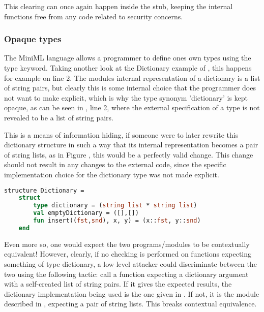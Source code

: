 This clearing can once again happen inside the stub, keeping the internal functions free from any code related to security concerns.

\subsubsection{Opaque types}

The \mbox{MiniML} language allows a programmer to define ones own types using the type keyword. Taking another look at the Dictionary example of , this happens for example on line 2. The modules internal representation of a dictionary is a list of string pairs, but clearly this is some internal choice that the programmer does not want to make explicit, which is why the type synonym 'dictionary' is kept opaque, as can be seen in , line 2, where the external specification of a type is not revealed to be a list of string pairs.

This is a means of information hiding, if someone were to later rewrite this dictionary structure in such a way that its internal representation becomes a pair of string lists, as in Figure , this would be a perfectly valid change. This change should not result in any changes to the external code, since the specific implementation choice for the dictionary type was not made explicit.

\begin{lstlisting}[frame=single, language=ML, label=code:DictionaryStructureExample2,caption={An alternative structure defining a dictionary.}]
structure Dictionary =
    struct
        type dictionary = (string list * string list)
        val emptyDictionary = ([],[])
        fun insert((fst,snd), x, y) = (x::fst, y::snd)
    end
\end{lstlisting}

Even more so, one would expect the two programs/modules to be contextually equivalent! However, clearly, if no checking is performed on functions expecting something of type dictionary, a low level attacker could discriminate between the two using the following tactic: call a function expecting a dictionary argument with a self-created list of string pairs. If it gives the expected results, the dictionary implementation being used is the one given in . If not, it is the module described in , expecting a pair of string lists. This breaks contextual equivalence.

